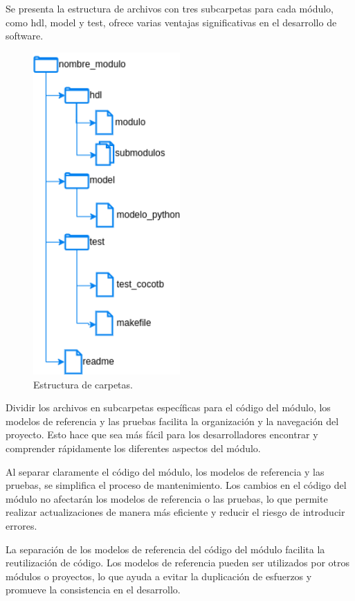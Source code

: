 Se presenta la estructura de archivos con tres subcarpetas para cada módulo, como hdl, model y test, ofrece varias ventajas significativas en el desarrollo de software.

\begin{figure}[h]
  \centering
  \includegraphics[width=0.5\textwidth]{./Figures/files.png}
  \caption{Estructura de carpetas.}\label{fig:files}
\end{figure}

Dividir los archivos en subcarpetas específicas para el código del módulo, los modelos de referencia y las pruebas facilita la organización y la navegación del proyecto. Esto hace que sea más fácil para los desarrolladores encontrar y comprender rápidamente los diferentes aspectos del módulo.

Al separar claramente el código del módulo, los modelos de referencia y las pruebas, se simplifica el proceso de mantenimiento. Los cambios en el código del módulo no afectarán los modelos de referencia o las pruebas, lo que permite realizar actualizaciones de manera más eficiente y reducir el riesgo de introducir errores.

La separación de los modelos de referencia del código del módulo facilita la reutilización de código. Los modelos de referencia pueden ser utilizados por otros módulos o proyectos, lo que ayuda a evitar la duplicación de esfuerzos y promueve la consistencia en el desarrollo.

